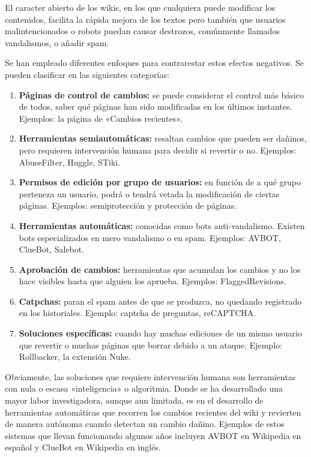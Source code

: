 \documentclass[11pt,onecolumn]{article}
\begin{document}
El caracter abierto de los wikis, en los que cualquiera puede modificar los contenidos, facilita la rápida mejora de los textos pero también que usuarios malintencionados o robots puedan causar destrozos, comúnmente llamados vandalismos, o añadir spam.

Se han empleado diferentes enfoques para contrarestar estos efectos negativos. Se pueden clasificar en las siguientes categorías:
\begin{enumerate}
\item \textbf{Páginas de control de cambios:} se puede considerar el control más básico de todos, saber qué páginas han sido modificadas en los últimos instantes. Ejemplos: la página de «Cambios recientes».
\item \textbf{Herramientas semiautomáticas:} resaltan cambios que pueden ser dañinos, pero requieren intervención humana para decidir si revertir o no. Ejemplos: AbuseFilter, Huggle, STiki.
\item \textbf{Permisos de edición por grupo de usuarios:} en función de a qué grupo perteneza un usuario, podrá o tendrá vetada la modificación de ciertas páginas. Ejemplos: semiprotección y protección de páginas.
\item \textbf{Herramientas automáticas:} conocidas como bots anti-vandalismo. Existen bots especializados en mero vandalismo o en spam. Ejemplos: AVBOT, ClueBot, Salebot.
\item \textbf{Aprobación de cambios:} herramientas que acumulan los cambios y no los hace visibles hasta que alguien los aprueba. Ejemplos: FlaggedRevisions.
\item \textbf{Catpchas:} paran el spam antes de que se produzca, no quedando registrado en los historiales. Ejemplo: captcha de preguntas, reCAPTCHA.
\item \textbf{Soluciones específicas:} cuando hay muchas ediciones de un mismo usuario que revertir o muchas páginas que borrar debido a un ataque. Ejemplo: Rollbacker, la extensión Nuke.
\end{enumerate}

Obviamente, las soluciones que requiere intervención humana son herramientas con nula o escasa «inteligencia» o algoritmia. Donde se ha desarrollado una mayor labor investigadora, aunque aun limitada, es en el desarrollo de herramientas automáticas que recorren los cambios recientes del wiki y revierten de manera autónoma cuando detectan un cambio dañino. Ejemplos de estos sistemas que llevan funcionando algunos años incluyen AVBOT \citep{avbot2009, avbot2010} en Wikipedia en español y ClueBot \citep{carter2008} en Wikipedia en inglés.
\end{document}

